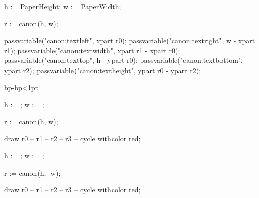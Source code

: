 
\startMPcalculation
	h := PaperHeight;
	w := PaperWidth;

	r := canon(h, w); %

	passvariable("canon:textleft",   xpart r0);
	passvariable("canon:textright",  w - xpart r1);
	passvariable("canon:textwidth",  xpart r1 - xpart r0);
	passvariable("canon:texttop",    h - ypart r0);
	passvariable("canon:textbottom", ypart r2);
	passvariable("canon:textheight", ypart r0 - ypart r2);
\stopMPcalculation

%
	\ifabsdim\dimexpr{}bp-bp\relax<1pt
		\enablemode[singlesided]
	\else
		\enablemode[doublesided]
	\fi
\stopnotallmodes

\startmode[debug]

			h := \overlayheight;
			w := \overlaywidth;

			r := canon(h, w);

			draw r0 -- r1 -- r2 -- r3 -- cycle withcolor red;


		\stopreusableMPgraphic

	\stopmode

	\startmode[doublesided]
			h := \overlayheight;
			w := \overlaywidth;

			r := canon(h, -w);

			draw r0 -- r1 -- r2 -- r3 -- cycle withcolor red;


